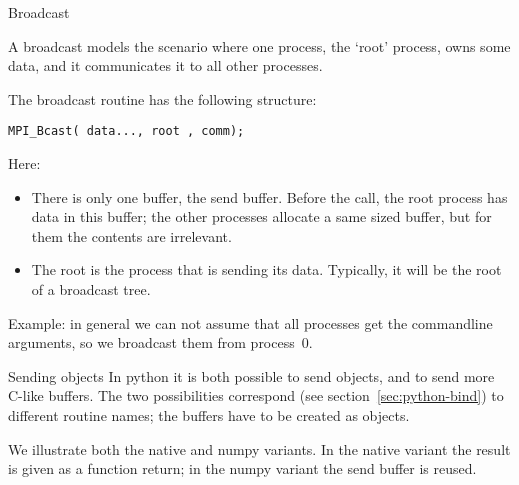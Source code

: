  {Broadcast}
\label{sec:bcast}

A broadcast models the scenario where one process,
the `root' process,
owns some data, and it communicates it to all other processes.

The broadcast routine
has the following structure:
\begin{lstlisting}
MPI_Bcast( data..., root , comm);
\end{lstlisting}
Here:
\begin{itemize}
\item There is only one buffer, the send buffer.
  Before the call, the root process has data in this buffer;
  the other processes allocate a same sized buffer, but
  for them the contents are irrelevant.
\item 
  The root is the process that is sending its data.
  Typically, it will be the root of a broadcast tree.
\end{itemize}

Example: in general we can not assume that all processes get the
commandline arguments, so we broadcast them from process~0.


\begin{comment}
  \begin{exercise}
    \label{ex:argv-bcast}
    If you give a commandline argument to a program, that argument is available
    as a character string as part of the \n{argv,argc} pair that you typically use
    as the arguments to your main program. You can use the function \n{atoi} to
    convert such a string to integer.

    Write a program where process~0 looks for an integer on the commandline, and
    broadcasts it to the other processes. Initialize the buffer on all processes, and
    let all processes print out the broadcast number,
    just to check that you solved the problem correctly.
  \end{exercise}
\end{comment}

\begin{pythonnote}{Sending objects}
  In python it is both possible to send objects, and to send more
  C-like buffers. The two possibilities correspond (see
  section~\ref{sec:python-bind}) to different routine names; the
  buffers have to be created as  objects.

  We illustrate both the native and numpy variants. In the native
  variant the result is given as a function return; in the numpy variant
  the send buffer is reused.

\end{pythonnote}

